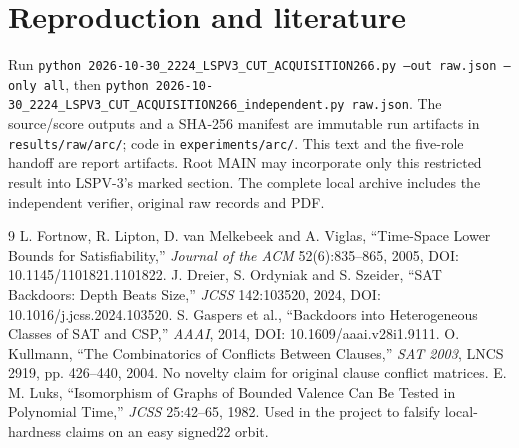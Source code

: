 \documentclass[11pt]{article}
\begin{document}
\section{Reproduction and literature}
Run \texttt{python 2026-10-30\_2224\_LSPV3\_CUT\_ACQUISITION266.py --out raw.json --only all}, then \texttt{python 2026-10-30\_2224\_LSPV3\_CUT\_ACQUISITION266\_independent.py raw.json}. The source/score outputs and a SHA-256 manifest are immutable run artifacts in \texttt{results/raw/arc/}; code in \texttt{experiments/arc/}. This text and the five-role handoff are report artifacts. Root MAIN may incorporate only this restricted result into LSPV-3's marked section. The complete local archive includes the independent verifier, original raw records and PDF.
\begin{thebibliography}{9}
 L. Fortnow, R. Lipton, D. van Melkebeek and A. Viglas, ``Time-Space Lower Bounds for Satisfiability,'' \emph{Journal of the ACM} 52(6):835--865, 2005, DOI: 10.1145/1101821.1101822.
 J. Dreier, S. Ordyniak and S. Szeider, ``SAT Backdoors: Depth Beats Size,'' \emph{JCSS} 142:103520, 2024, DOI: 10.1016/j.jcss.2024.103520.
 S. Gaspers et al., ``Backdoors into Heterogeneous Classes of SAT and CSP,'' \emph{AAAI}, 2014, DOI: 10.1609/aaai.v28i1.9111.
 O. Kullmann, ``The Combinatorics of Conflicts Between Clauses,'' \emph{SAT 2003}, LNCS 2919, pp. 426--440, 2004. No novelty claim for original clause conflict matrices.
 E. M. Luks, ``Isomorphism of Graphs of Bounded Valence Can Be Tested in Polynomial Time,'' \emph{JCSS} 25:42--65, 1982. Used in the project to falsify local-hardness claims on an easy signed22 orbit.
\end{thebibliography}
\end{document}
